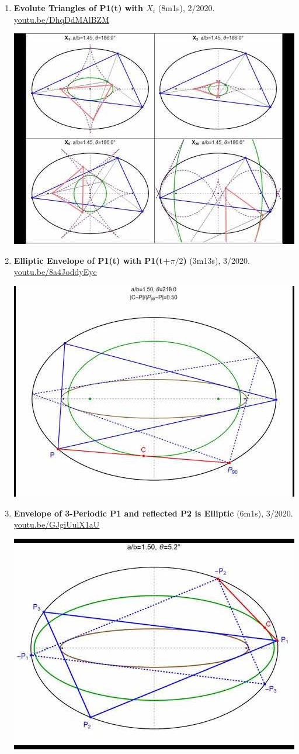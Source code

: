 \documentclass[12pt]{article}
\begin{document}
\begin{enumerate}[resume]
% 
\item \textbf{Evolute Triangles of P1(t) with $X_i$} (8m1s), 2/2020. \href{https://youtu.be/DhqDdMAlBZM}{\url{youtu.be/DhqDdMAlBZM}}
\begin{center}\includegraphics[width=.5\textwidth]{pics/DhqDdMAlBZM.jpg}\end{center}
% 
\item \textbf{Elliptic Envelope of P1(t) with P1(t+$\pi/2$)} (3m13s), 3/2020. \href{https://youtu.be/8a4JoddyEyc}{\url{youtu.be/8a4JoddyEyc}}
\begin{center}\includegraphics[width=.5\textwidth]{pics/8a4JoddyEyc.jpg}\end{center}
% 
\item \textbf{Envelope of 3-Periodic P1 and reflected P2 is Elliptic} (6m1s), 3/2020. \href{https://youtu.be/GJgiUulX1aU}{\url{youtu.be/GJgiUulX1aU}}
\begin{center}\includegraphics[width=.5\textwidth]{pics/GJgiUulX1aU.jpg}\end{center}

\end{enumerate}
\end{document}
